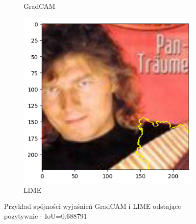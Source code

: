 \begin{figure}[h]
\begin{subfigure}[b]{0.3\textwidth}
		\caption{GradCAM}  \label{}
	\end{subfigure}
	\begin{subfigure}[b]{0.3\textwidth}
		\centering\includegraphics[width=.9\textwidth]{img/examples/appendix/n03884397_34878_lime}
		\caption{LIME}
	\end{subfigure}
	\caption{Przykład spójności wyjaśnień GradCAM i LIME odstające pozytywnie - IoU=0.688791}
	\label{}
\end{figure}
